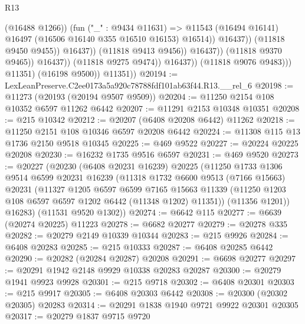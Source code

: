 \begin{lexlean}{R13}
\begin{coremodule}
                                                (@16488 @1266))
                                              (fun ("_" : @9434 @11631) =>
                                              @11543
                                                (@16494 @16141)
                                                @16497
                                                (@16506 @16140 @355 @16510 @16153)
                                                @16514))
                                            @16437))
                                        (@11818 @9450 @9455))
                                      @16437))
                                  (@11818 @9413 @9456))
                                @16437))
                            (@11818 @9370 @9465))
                          @16437))
                      (@11818 @9275 @9474))
                    @16437))
                (@11818 @9076 @9483)))
            @11351)
          (@16198 @9500))
        @11351))
@20194 := LexLeanPreserve.C2ee0173a5a920c78788fdf101ab63f44.R13.__rel_6
@20198 := @11273 (@20193 (@20194 @9507 @9509))
@20204 := @11250 @2154 @108 @10352 @6597 @11262 @6442
@20207 := @11291 @2153 @10348 @10351
@20208 := @215 @10342
@20212 := @20207 (@6408 @20208 @6442) @11262
@20218 := @11250 @2151 @108 @10346 @6597 @20208 @6442
@20224 := @11308 @115 @13 @1736 @2150 @9518 @10345
@20225 := @469 @9522
@20227 := @20224 @20225 @20208
@20230 := @16232 @1735 @9516 @6597
@20231 := @469 @9520
@20273 := @20227
    (@20230
      (@6408 @20231 @16239)
      @20225
      (@11250
        @1733
        @1306
        @9514
        @6599
        @20231
        @16239
        (@11318
          @1732
          @6600
          @9513
          (@7166 @15663)
          @20231
          (@11327
            @1205
            @6597
            @6599
            @7165
            @15663
            @11339
            (@11250 @1203 @108 @6597 @6597 @1202 @6442 (@11348 @1202) @11351))
          (@11356 @1201))
        @16283)
      (@11531 @9520 @1302))
@20274 := @6642 @115
@20277 := @6639 (@20274 @20225) @11223
@20278 := @6682 @20277
@20279 := @20278 @335
@20282 := @20279 @2149 @10339 @10344
@20283 := @215 @9926
@20284 := @6408 @20283
@20285 := @215 @10333
@20287 := @6408 @20285 @6442
@20290 := @20282 (@20284 @20287) @20208
@20291 := @6698 @20277
@20297 := @20291 @1942 @2148 @9929 @10338 @20283 @20287
@20300 := @20279 @1941 @9923 @9928
@20301 := @215 @9718
@20302 := @6408 @20301
@20303 := @215 @9917
@20305 := @6408 @20303 @6442
@20308 := @20300 (@20302 @20305) @20283
@20314 := @20291 @1838 @1940 @9721 @9922 @20301 @20305
@20317 := @20279 @1837 @9715 @9720

\end{coremodule}
\end{lexlean}
